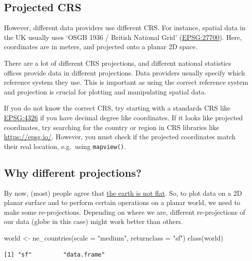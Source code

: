 \documentclass[
  letterpaper,
]{scrbook}
\newenvironment{Shaded}{\begin{snugshade}}{\end{snugshade}}
\newcommand{\AttributeTok}[1]{\textcolor[rgb]{0.40,0.45,0.13}{#1}}
\newcommand{\FunctionTok}[1]{\textcolor[rgb]{0.28,0.35,0.67}{#1}}
\newcommand{\NormalTok}[1]{\textcolor[rgb]{0.00,0.23,0.31}{#1}}
\newcommand{\OtherTok}[1]{\textcolor[rgb]{0.00,0.23,0.31}{#1}}
\newcommand{\StringTok}[1]{\textcolor[rgb]{0.13,0.47,0.30}{#1}}
\begin{document}
\hypertarget{projected-crs}{%
\subsection{Projected CRS}\label{projected-crs}}

However, different data providers use different CRS. For instance,
spatial data in the UK usually uses `OSGB 1936 / British National Grid'
(\href{https://epsg.io/27700}{EPSG:27700}). Here, coordinates are in
meters, and projected onto a planar 2D space.

There are a lot of different CRS projections, and different national
statistics offices provide data in different projections. Data providers
usually specify which reference system they use. This is important as
using the correct reference system and projection is crucial for
plotting and manipulating spatial data.

If you do not know the correct CRS, try starting with a standards CRS
like \href{https://epsg.io/4326}{EPSG:4326} if you have decimal degree
like coordinates. If it looks like projected coordinates, try searching
for the country or region in CRS libraries like \url{https://epsg.io/}.
However, you must check if the projected coordinates match their real
location, e.g.~using \texttt{mapview()}.

\hypertarget{why-different-projections}{%
\subsection{Why different
projections?}\label{why-different-projections}}

By now, (most) people agree that
\href{https://r-spatial.org/r/2020/06/17/s2.html}{the earth is not
flat}. So, to plot data on a 2D planar surface and to perform certain
operations on a planar world, we need to make some re-projections.
Depending on where we are, different re-projections of our data (globe
in this case) might work better than others.

\begin{Shaded}
\begin{Highlighting}[]
\NormalTok{world }\OtherTok{\textless{}{-}} \FunctionTok{ne\_countries}\NormalTok{(}\AttributeTok{scale =} \StringTok{"medium"}\NormalTok{, }\AttributeTok{returnclass =} \StringTok{"sf"}\NormalTok{)}
\FunctionTok{class}\NormalTok{(world)}
\end{Highlighting}
\end{Shaded}

\begin{verbatim}
[1] "sf"         "data.frame"
\end{verbatim}
\end{document}
